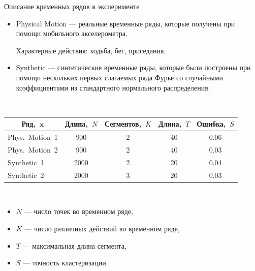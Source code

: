 \documentclass[10pt,pdf,hyperref={unicode}]{beamer}
\begin{document}
\begin{frame}[shrink=5]{Описание временных рядов в эксперименте}

\begin{itemize}
\justifying
	\item Physical Motion --- реальные временные ряды, которые получены при помощи мобильного акселерометра.  
	
	Характерные действия: ходьба, бег, приседания.
	\item Synthetic --- синтетические временные ряды, которые были построены при помощи нескольких первых слагаемых ряда Фурье со случайными коэффициентами из стандартного нормального распределения. 
\end{itemize}

~\\
\begin{tabular}{|c|c|c|c|c|}
\hline
	Ряд,~$\textbf{x}$ &Длина,~$N$& Сегментов,~$K$&Длина,~$T$& Ошибка,~$S$\\
	\hline
	\multicolumn{1}{|l|}{Phys.~Motion~1}
	& 900& 2& 40& 0.06\\
	\hline
	\multicolumn{1}{|l|}{Phys.~Motion~2}
	& 900& 2& 40& 0.03\\
	\hline
	\multicolumn{1}{|l|}{Synthetic~1}
	& 2000& 2& 20& 0.04\\
	\hline
	\multicolumn{1}{|l|}{Synthetic~2}
	& 2000& 3& 20& 0.03\\
\hline
\end{tabular}

~\\
\begin{itemize}
	\item $N$ --- число точек во временном ряде,
	\item $K$ --- число различных действий во временном ряде,
	\item $T$ --- максимальная длина сегмента,
	\item $S$ --- точность кластеризации.
\end{itemize}

\end{frame}
\end{document}
